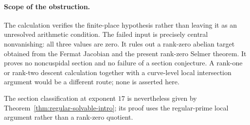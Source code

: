 \paragraph{Scope of the obstruction.}
The calculation verifies the finite-place hypothesis rather than
leaving it as an unresolved arithmetic condition.  The failed input
is precisely central nonvanishing: all three values are zero.
It rules out a rank-zero abelian target obtained from the Fermat
Jacobian and the present rank-zero Selmer theorem.  It proves no
noncuspidal section and no failure of a section conjecture.  A
rank-one or rank-two descent calculation together with a curve-level
local intersection argument would be a different route; none is
asserted here.

The section classification at exponent $17$ is nevertheless given
by Theorem~\ref{thm:regular-solvable-intro}; its proof uses the
regular-prime local argument rather than a rank-zero quotient.
